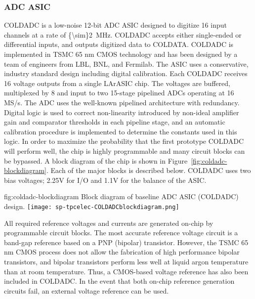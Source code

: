 \subsubsection{ADC ASIC}
\label{sec:fdsp-tpcelec-design-femb-adc}

COLDADC is a low-noise 12-bit ADC ASIC designed to digitize 16 input channels at a rate of \SI{{\sim}2}{MHz}.  COLDADC accepts either single-ended or differential inputs, and outputs digitized data to COLDATA.  COLDADC is implemented in TSMC 65 nm CMOS technology and has been designed by a team of engineers from LBL, BNL, and Fermilab.  The ASIC uses a conservative, industry standard design including digital calibration.  Each COLDADC receives 16 voltage outputs from a single LArASIC chip.  The voltages are buffered, multiplexed by 8 and input to two 15-stage pipelined ADCs operating at 16 MS/s.  The ADC uses the well-known pipelined architecture with redundancy\cite{PipelinedADC}\cite{CalibrationCorrection}.  Digital logic is used to correct non-linearity introduced by non-ideal amplifier gain and comparator thresholds in each pipeline stage, and an automatic calibration procedure is implemented to determine the constants used in this logic.  In order to maximize the probability that the first prototype COLDADC will perform well, the chip is highly programmable and many circuit blocks can be bypassed.  A block diagram of the chip is shown in Figure~\ref{fig:coldadc-blockdiagram}.  Each of the major blocks is described below.  COLDADC uses two bias voltages; 2.25V for I/O and 1.1V for the balance of the ASIC.

\begin{dunefigure}
{fig:coldadc-blockdiagram}
{Block diagram of baseline ADC ASIC (COLDADC) design.}
\texttt{[image: sp-tpcelec-COLDADCblockdiagram.png]}
\end{dunefigure}


All required reference voltages and currents are generated on-chip by programmable circuit blocks.  The most accurate reference voltage circuit is a band-gap reference based on a PNP (bipolar) transistor.  However, the TSMC 65 nm CMOS process does not allow the fabrication of high performance bipolar transistors, and bipolar transistors perform less well at liquid argon temperature than at room temperature.  Thus, a CMOS-based voltage reference has also been included in COLDADC.  In the event that both on-chip reference generation circuits fail, an external voltage reference can be used.


